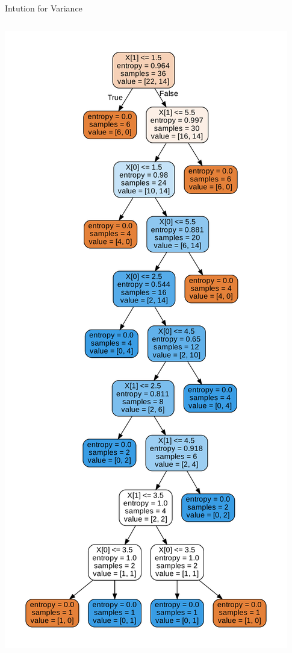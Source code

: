 \documentclass{beamer}
\begin{document}
\begin{frame}{Intution for Variance}
\begin{columns}
\begin{column}{0.5\textwidth}
\begin{center}
\includegraphics[scale=0.2]{../bias-variance/imgs/var_1}

\end{center}
\end{column}
\end{columns}
\end{frame}
\end{document}
